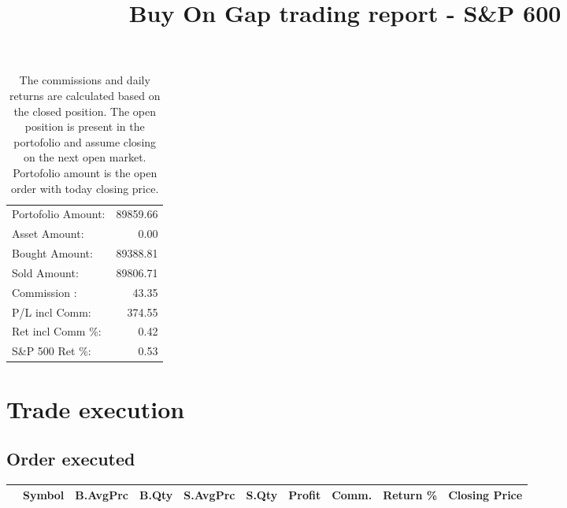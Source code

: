 \documentclass{tufte-handout}\usepackage[]{graphicx}\usepackage[]{color}
\begin{document}
\begin{table}[ht]
\begin{tabular}{lr}
   \hline
Portofolio Amount: & 89859.66 \\ 
  Asset Amount: & 0.00 \\ 
  Bought Amount: & 89388.81 \\ 
  Sold   Amount: & 89806.71 \\ 
  Commission   : & 43.35 \\ 
  P/L incl Comm: & 374.55 \\ 
  Ret incl Comm \%: & 0.42 \\ 
  S\&P 500 Ret \%: & 0.53 \\ 
   \hline
\end{tabular}
\caption{The commissions and daily returns are calculated based on the closed position.
The open position is present in the portofolio and assume closing on the next open market.
Portofolio amount is the open order with today closing price.} 
\end{table}



% 
% 


\title{Buy On Gap trading report - S\&P 600}
\maketitle

\section{Trade execution}
\subsection{Order executed}


\begin{table}[ht]
\centering
\begin{tabular}{llrrrrrrr|r}
  \hline
 & Symbol & B.AvgPrc & B.Qty & S.AvgPrc & S.Qty & Profit & Comm. & Return \% & Closing Price \\ 
  \hline
\hline
\end{tabular}
\end{table}
\end{document}
